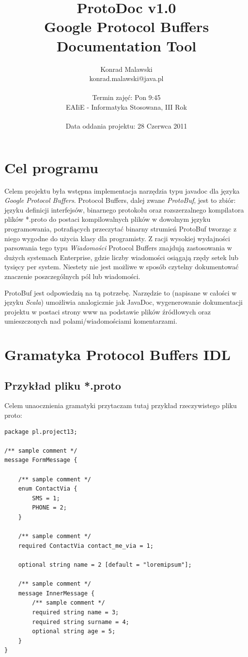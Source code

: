 \documentclass[a4paper]{article}
\title{
	\textbf{ProtoDoc} v1.0 \\
	Google Protocol Buffers Documentation Tool\\ 
}
\author{
	Konrad Malawski \\
	konrad.malawski@java.pl \\
	\\ 
	Termin zajęć: Pon 9:45 \\
	EAIiE - Informatyka Stosowana, III Rok \\
	\\
	Data oddania projektu: 28 Czerwca 2011
}
\begin{document}
\maketitle

\tableofcontents

\newpage

\section{Cel programu}
Celem projektu była wstępna implementacja narzędzia typu javadoc dla języka \textit{Google Protocol Buffers}.
Protocol Buffers, dalej zwane \textit{ProtoBuf}, jest to zbiór: języku definicji interfejsów, binarnego protokołu oraz rozszerzalnego kompilatora plików *.proto
do postaci kompilowalnych plików w dowolnym języku programowania, potrafiących przeczytać binarny strumień ProtoBuf tworząc z niego wygodne do użycia klasy dla programisty.
Z racji wysokiej wydajności parsowania tego typu \textit{Wiadomości} Protocol Buffers znajdują zastosowania w dużych systemach Enterprise, gdzie liczby wiadomości
osiągają rzędy setek lub tysięcy per system. Niestety nie jest możliwe w sposób czytelny dokumentować znaczenie poszczególnych pól lub wiadomości.

ProtoBuf jest odpowiedzią na tą potrzebę. Narzędzie to (napisane w całości w języku \textit{Scala}) umożliwia analogicznie jak JavaDoc, 
wygenerowanie dokumentacji projektu w postaci strony www na podstawie plików źródłowych oraz umieszczonych nad polami/wiadomościami komentarzami.

\section{Gramatyka Protocol Buffers IDL}
\subsection{Przykład pliku *.proto}
Celem unaocznienia gramatyki przytaczam tutaj przykład rzeczywistego pliku proto:
\begin{lstlisting}
package pl.project13;

/** sample comment */
message FormMessage {

    /** sample comment */
    enum ContactVia {
        SMS = 1;
        PHONE = 2;
    }

    /** sample comment */
    required ContactVia contact_me_via = 1;

    optional string name = 2 [default = "loremipsum"];

    /** sample comment */
    message InnerMessage {
        /** sample comment */
        required string name = 3;
        required string surname = 4;
        optional string age = 5;
    }
} 
\end{lstlisting}
\end{document}
